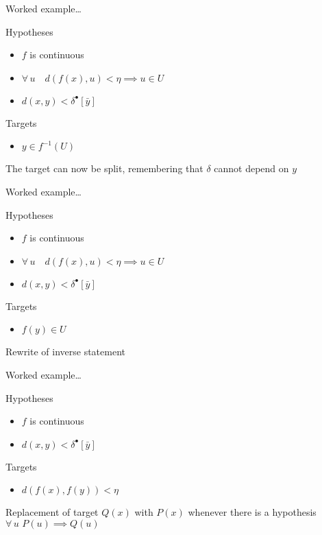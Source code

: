 \begin{frame}{Worked example\ldots}
  \begin{block}{Hypotheses}
    \begin{itemize}
      \item $f$ is continuous
      \item $\forall\,u\quad d(f(x), u) < \eta \implies u \in U$
      \item $d(x, y) < \delta^\bullet[\bar{y}]$
    \end{itemize}
  \end{block}
  \begin{block}{Targets}
    \begin{itemize}
      \item $y \in f^{-1}(U)$
    \end{itemize}
  \end{block}
  \begin{block}{}
    The target can now be split, remembering that $\delta$ cannot depend on $y$
  \end{block}
\end{frame}

\begin{frame}{Worked example\ldots}
  \begin{block}{Hypotheses}
    \begin{itemize}
      \item $f$ is continuous
      \item $\forall\,u\quad d(f(x), u) < \eta \implies u \in U$
      \item $d(x, y) < \delta^\bullet[\bar{y}]$
    \end{itemize}
  \end{block}
  \begin{block}{Targets}
    \begin{itemize}
      \item $f(y) \in U$
    \end{itemize}
  \end{block}
  \begin{block}{}
    Rewrite of inverse statement
  \end{block}
\end{frame}

\begin{frame}{Worked example\ldots}
  \begin{block}{Hypotheses}
    \begin{itemize}
      \item $f$ is continuous
      \item $d(x, y) < \delta^\bullet[\bar{y}]$
    \end{itemize}
  \end{block}
  \begin{block}{Targets}
    \begin{itemize}
      \item $d(f(x), f(y)) < \eta$
    \end{itemize}
  \end{block}
  \begin{block}{}
    Replacement of target $Q(x)$ with $P(x)$ whenever there is a hypothesis $\forall\,u\,\,P(u) \implies Q(u)$
  \end{block}
\end{frame}

